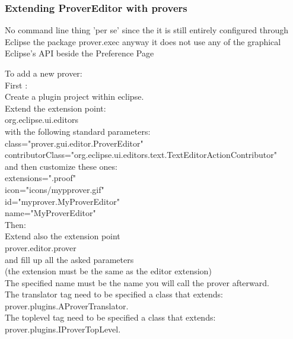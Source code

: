 \documentclass{entcs}
\begin{document}
\subsubsection{Extending ProverEditor with provers}
No command line thing 'per se' since
the it is still entirely configured through Eclipse
the package prover.exec anyway it does not use any of the graphical 
Eclipse's API beside the Preference Page

To add a new prover:\\

First :\\
Create a plugin project within eclipse.\\
Extend the extension point:\\
org.eclipse.ui.editors\\
with the following standard parameters:\\
class="prover.gui.editor.ProverEditor"\\
contributorClass="org.eclipse.ui.editors.text.TextEditorActionContributor"\\
and then customize these ones:\\
extensions=".proof"\\
icon="icons/mypprover.gif"\\
id="myprover.MyProverEditor"\\
name="MyProverEditor"\\

Then:\\
Extend also the extension point\\
prover.editor.prover\\
and fill up all the asked parameters\\
(the extension must be the same as the editor extension)\\
The specified name must be the name you will call the prover afterward.\\
The translator tag need to be specified a class that extends:\\
prover.plugins.AProverTranslator.\\
The toplevel tag need to be specified a class that extends:\\
prover.plugins.IProverTopLevel.\\


\end{document}
